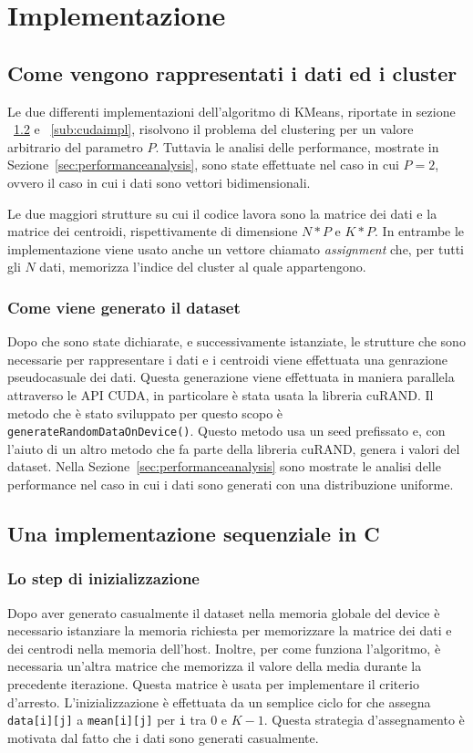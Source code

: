 \documentclass[10pt,twocolumn,letterpaper]{article}
\begin{document}
\section{Implementazione}
\subsection{Come vengono rappresentati i dati ed i cluster}
Le due differenti implementazioni dell'algoritmo di KMeans, riportate in sezione  ~\ref{sub:Cimpl} e ~\ref{sub:cudaimpl}, risolvono il problema del clustering per  un valore arbitrario del parametro $P$. Tuttavia le analisi delle performance, mostrate in Sezione~\ref{sec:performanceanalysis}, sono state effettuate nel caso in cui $P=2$, ovvero il caso in cui i dati sono vettori bidimensionali. \par
Le due maggiori strutture su cui il codice lavora sono la matrice dei dati e la matrice dei centroidi, rispettivamente di dimensione $N*P$ e $K*P$. In entrambe le implementazione viene usato anche un vettore chiamato \textit{assignment} che, per tutti gli $N$ dati, memorizza l'indice del cluster al quale appartengono.

\subsubsection{Come viene generato il dataset}
Dopo che sono state dichiarate, e successivamente istanziate, le strutture che sono necessarie per rappresentare i dati e i centroidi viene effettuata una genrazione pseudocasuale dei dati. Questa generazione viene effettuata in maniera parallela attraverso le API CUDA, in particolare è stata usata la libreria cuRAND. Il metodo che è stato sviluppato per questo scopo è \texttt{generateRandomDataOnDevice()}. Questo metodo usa un seed prefissato e, con l'aiuto di un altro metodo che fa parte della libreria cuRAND, genera i valori del dataset. Nella Sezione~\ref{sec:performanceanalysis} sono mostrate le analisi delle performance nel caso in cui i dati sono generati con una distribuzione uniforme. 

\subsection{Una implementazione sequenziale in C}

\label{sub:Cimpl}

\subsubsection*{Lo step di inizializzazione}
Dopo aver generato casualmente il dataset nella memoria globale del device è necessario istanziare la memoria richiesta per memorizzare la matrice dei dati e dei centrodi nella memoria dell'host. Inoltre, per come funziona l'algoritmo, è necessaria un'altra matrice che memorizza il valore della media durante la precedente iterazione. Questa matrice è usata per implementare il criterio d'arresto. L'inizializzazione è effettuata da un semplice ciclo for che assegna \texttt{data[i][j]} a \texttt{mean[i][j]} per  \texttt{i} tra $0$ e $K-1$. Questa strategia d'assegnamento è motivata dal fatto che i dati sono generati casualmente.
\end{document}
